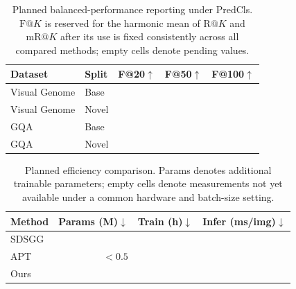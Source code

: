 \begin{table}[t]
\centering
\caption{Planned balanced-performance reporting under PredCls. $\mathrm{F}@K$ is reserved for the harmonic mean of $\mathrm{R}@K$ and $\mathrm{mR}@K$ after its use is fixed consistently across all compared methods; empty cells denote pending values.}
\label{tab:balanced_metrics}
\small
\begin{tabular}{llrrr}
\toprule
Dataset & Split & F@20$\uparrow$ & F@50$\uparrow$ & F@100$\uparrow$ \\
\midrule
Visual Genome & Base & & & \\
Visual Genome & Novel & & & \\
GQA & Base & & & \\
GQA & Novel & & & \\
\bottomrule
\end{tabular}
\end{table}

\begin{table}[t]
\centering
\caption{Planned efficiency comparison. Params denotes additional trainable parameters; empty cells denote measurements not yet available under a common hardware and batch-size setting.}
\label{tab:efficiency}
\small
\setlength{\tabcolsep}{4.0pt}
\begin{tabular}{lrrr}
\toprule
Method & Params (M)$\downarrow$ & Train (h)$\downarrow$ & Infer (ms/img)$\downarrow$ \\
\midrule
SDSGG & & & \\
APT \cite{luo2026apt} & $<0.5$ & & \\
Ours & & & \\
\bottomrule
\end{tabular}
\end{table}
